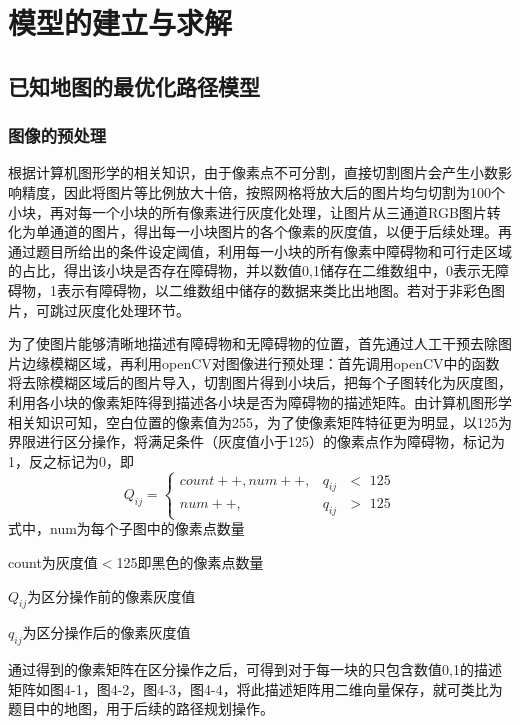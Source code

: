\documentclass[withoutpreface,bwprint]{cumcmthesis} %
\begin{document}
\section{模型的建立与求解}

\subsection{已知地图的最优化路径模型}

\subsubsection{图像的预处理}

根据计算机图形学的相关知识，由于像素点不可分割，直接切割图片会产生小数影响精度，因此将图片等比例放大十倍，按照网格将放大后的图片均匀切割为100个小块，再对每一个小块的所有像素进行灰度化处理，让图片从三通道RGB图片转化为单通道的图片，得出每一小块图片的各个像素的灰度值，以便于后续处理。再通过题目所给出的条件设定阈值，利用每一小块的所有像素中障碍物和可行走区域的占比，得出该小块是否存在障碍物，并以数值0,1储存在二维数组中，0表示无障碍物，1表示有障碍物，以二维数组中储存的数据来类比出地图。若对于非彩色图片，可跳过灰度化处理环节。

为了使图片能够清晰地描述有障碍物和无障碍物的位置，首先通过人工干预去除图片边缘模糊区域，再利用openCV对图像进行预处理：首先调用openCV中的函数将去除模糊区域后的图片导入，切割图片得到小块后，把每个子图转化为灰度图，利用各小块的像素矩阵得到描述各小块是否为障碍物的描述矩阵。由计算机图形学相关知识可知，空白位置的像素值为255，为了使像素矩阵特征更为明显，以125为界限进行区分操作，将满足条件（灰度值小于125）的像素点作为障碍物，标记为1，反之标记为0，即
$$
Q_{ij} =
\begin{cases}
count++,num++, &\text{$q_{ij}$ $<$ 125}\\
num++, &\text{$q_{ij}$ $>$ 125}
\end{cases}
$$
式中，num为每个子图中的像素点数量

\hspace*{0.5cm}
count为灰度值$<$125即黑色的像素点数量

\hspace*{0.5cm}
$Q_{ij}$为区分操作前的像素灰度值
     
\hspace*{0.5cm}
$q_{ij}$为区分操作后的像素灰度值

通过得到的像素矩阵在区分操作之后，可得到对于每一块的只包含数值0,1的描述矩阵如图4-1，图4-2，图4-3，图4-4，将此描述矩阵用二维向量保存，就可类比为题目中的地图，用于后续的路径规划操作。
\end{document}
